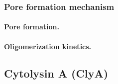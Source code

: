 \subsubsection{Pore formation mechanism}

\paragraph{Pore formation.}
%

\paragraph{Oligomerization kinetics.}
%

\subsection{Cytolysin A (ClyA)}

